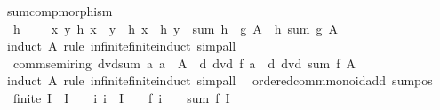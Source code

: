 \begin{isabellebody}
\isamarkupfalse%
%
\endisatagproof
{\isafoldproof}%
%
\isadelimproof
\isanewline
%
\endisadelimproof
\isanewline
{}\isamarkupfalse%
\ sum{\isacharunderscore}{\kern0pt}comp{\isacharunderscore}{\kern0pt}morphism{\isacharcolon}{\kern0pt}\isanewline
\ \ {\isachardoublequoteopen}h\ {}\ {\isacharequal}{\kern0pt}\ {}\ {\isasymLongrightarrow}\ {\isacharparenleft}{\kern0pt}{\isasymAnd}x\ y{\isachardot}{\kern0pt}\ h\ {\isacharparenleft}{\kern0pt}x\ {\isacharplus}{\kern0pt}\ y{\isacharparenright}{\kern0pt}\ {\isacharequal}{\kern0pt}\ h\ x\ {\isacharplus}{\kern0pt}\ h\ y{\isacharparenright}{\kern0pt}\ {\isasymLongrightarrow}\ sum\ {\isacharparenleft}{\kern0pt}h\ {\isasymcirc}\ g{\isacharparenright}{\kern0pt}\ A\ {\isacharequal}{\kern0pt}\ h\ {\isacharparenleft}{\kern0pt}sum\ g\ A{\isacharparenright}{\kern0pt}{\isachardoublequoteclose}\isanewline
%
\isadelimproof
\ \ %
\endisadelimproof
%
\isatagproof
{}\isamarkupfalse%
\ {\isacharparenleft}{\kern0pt}induct\ A\ rule{\isacharcolon}{\kern0pt}\ infinite{\isacharunderscore}{\kern0pt}finite{\isacharunderscore}{\kern0pt}induct{\isacharparenright}{\kern0pt}\ simp{\isacharunderscore}{\kern0pt}all%
\endisatagproof
{\isafoldproof}%
%
\isadelimproof
\isanewline
%
\endisadelimproof
\isanewline
{}\isamarkupfalse%
\ {\isacharparenleft}{\kern0pt}\ comm{\isacharunderscore}{\kern0pt}semiring{\isacharunderscore}{\kern0pt}{}{\isacharparenright}{\kern0pt}\ dvd{\isacharunderscore}{\kern0pt}sum{\isacharcolon}{\kern0pt}\ {\isachardoublequoteopen}{\isacharparenleft}{\kern0pt}{\isasymAnd}a{\isachardot}{\kern0pt}\ a\ {\isasymin}\ A\ {\isasymLongrightarrow}\ d\ dvd\ f\ a{\isacharparenright}{\kern0pt}\ {\isasymLongrightarrow}\ d\ dvd\ sum\ f\ A{\isachardoublequoteclose}\isanewline
%
\isadelimproof
\ \ %
\endisadelimproof
%
\isatagproof
{}\isamarkupfalse%
\ {\isacharparenleft}{\kern0pt}induct\ A\ rule{\isacharcolon}{\kern0pt}\ infinite{\isacharunderscore}{\kern0pt}finite{\isacharunderscore}{\kern0pt}induct{\isacharparenright}{\kern0pt}\ simp{\isacharunderscore}{\kern0pt}all%
\endisatagproof
{\isafoldproof}%
%
\isadelimproof
\isanewline
%
\endisadelimproof
\isanewline
{}\isamarkupfalse%
\ {\isacharparenleft}{\kern0pt}\ ordered{\isacharunderscore}{\kern0pt}comm{\isacharunderscore}{\kern0pt}monoid{\isacharunderscore}{\kern0pt}add{\isacharparenright}{\kern0pt}\ sum{\isacharunderscore}{\kern0pt}pos{\isacharcolon}{\kern0pt}\isanewline
\ \ {\isachardoublequoteopen}finite\ I\ {\isasymLongrightarrow}\ I\ {\isasymnoteq}\ {\isacharbraceleft}{\kern0pt}{\isacharbraceright}{\kern0pt}\ {\isasymLongrightarrow}\ {\isacharparenleft}{\kern0pt}{\isasymAnd}i{\isachardot}{\kern0pt}\ i\ {\isasymin}\ I\ {\isasymLongrightarrow}\ {}\ {\isacharless}{\kern0pt}\ f\ i{\isacharparenright}{\kern0pt}\ {\isasymLongrightarrow}\ {}\ {\isacharless}{\kern0pt}\ sum\ f\ I{\isachardoublequoteclose}\isanewline

\end{isabellebody}
